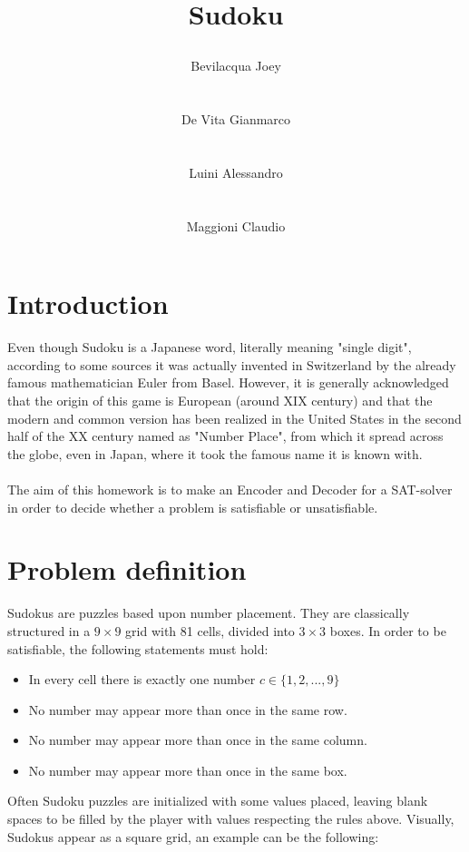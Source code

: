 \documentclass[]{usiinfprospectus}
\author{\centerline{Bevilacqua Joey} \\[3pt] \centerline{De Vita Gianmarco}  \\[3pt] \centerline{Luini Alessandro}  \\[3pt] \centerline{Maggioni Claudio}}
\title{\centerline{Sudoku}}
\newcounter{row}
\newcounter{col}
\begin{document}
\maketitle
\tableofcontents
\newpage
\section{Introduction} \label{introduction}
Even though Sudoku is a Japanese word, literally meaning "single digit", according to some sources it was actually invented in Switzerland by the already famous mathematician Euler from Basel. However, it is generally acknowledged that the origin of this game is European (around XIX century) and that the modern and common version has been realized in the United States in the second half of the XX century named as "Number Place", from which it spread across the globe, even in Japan, where it took the famous name it is known with.\\ \\
The aim of this homework is to make an Encoder and Decoder for a SAT-solver in order to decide whether a problem is satisfiable or unsatisfiable. 
\newpage
\section{Problem definition} \label{problem}
Sudokus are puzzles based upon number placement. They are classically structured in a $9\times 9$ grid with 81 cells, divided into $3\times 3$ boxes. In order to be satisfiable, the following statements must hold:
\begin{itemize}%
\item In every cell there is exactly one number $c \in \{1, 2, ..., 9 \}$
\item No number may appear more than once in the same row.
\item No number may appear more than once in the same column.
\item No number may appear more than once in the same box.
\end{itemize}
Often Sudoku puzzles are initialized with some values placed, leaving blank spaces to be filled by the player with values respecting the rules above. Visually, Sudokus appear as a square grid, an example can be the following:
\end{document}
